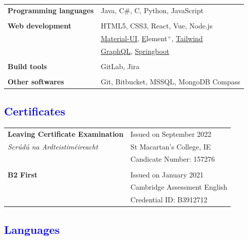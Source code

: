 \documentclass[12pt]{article}
\begin{document}
\begin{table}[H]
	\begin{tabular}{ll}
		\textbf{Programming languages} & Java, C\#, C, Python, JavaScript\\
		\\
		\textbf{Web development} & HTML5, CSS3, React, Vue, Node.js\\
		& \href{https://mui.com/material-ui/}{Material-UI}, \href{https://element-plus.org/en-US/}Element$^{+}$, \href{https://tailwindcss.com/}{Tailwind}\\
        & \href{https://graphql.org/}{GraphQL}, \href{https://spring.io/projects/spring-boot}{Springboot}\\
		\\
		\textbf{Build tools} & GitLab, Jira\\
		\\
		\textbf{Other softwares} & Git, Bitbucket, MSSQL, MongoDB Compass\\
	\end{tabular}
\end{table}

\textcolor{blue}{\section*{Certificates} }

\begin{table}[H]
	\begin{tabular}{ll}
        \textbf{Leaving Certificate Examination} & Issued on September 2022\\
        \textit{Scrúdú na Ardteistiméireacht} & St Macartan’s College, IE\\ 
        & Candicate Number: 157276 \\
        \\
		\textbf{B2 First  } & Issued on January 2021\\
        & Cambridge Assessment English\\ 
        & Credential ID: B3912712
	\end{tabular}
\end{table}


\textcolor{blue}{\section*{Languages}}
\end{document}
